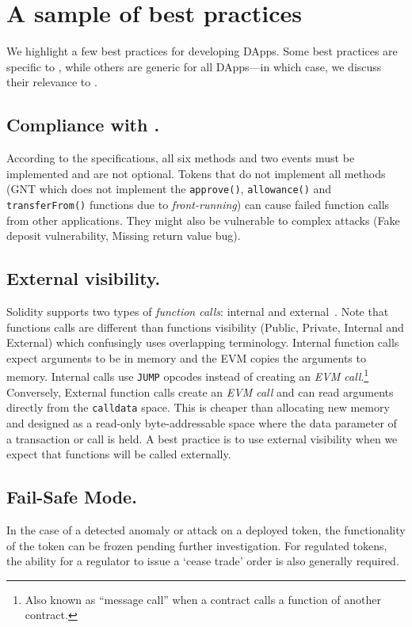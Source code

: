 
\section{A sample of best practices}\label{sec:bp}

We highlight a few best practices for developing DApps. Some best practices are specific to \erc, while others are generic for all DApps---in which case, we discuss their relevance to \erc.

\subsection{Compliance with \erc.}\label{subsec:compl}
According to the \erc specifications, all six methods and two events must be implemented and are not optional. Tokens that do not implement all methods (\eg GNT which does not implement the \texttt{approve()}, \texttt{allowance()} and \texttt{transferFrom()} functions due to \textit{front-running}\cite{GNT}) can cause failed function calls from other applications. They might also be vulnerable to complex attacks (\eg Fake deposit vulnerability\cite{DEPOSafe}, Missing return value bug\cite{ErcBug}).

\subsection{External visibility.}\label{subsec:external}
Solidity supports two types of \textit{function calls}: internal and external~\cite{SolidityDoc}. Note that functions calls are different than functions visibility (\ie Public, Private, Internal and External) which confusingly uses overlapping terminology. Internal function calls expect arguments to be in memory and the EVM copies the arguments to memory. Internal calls use \texttt{JUMP} opcodes instead of creating an \textit{EVM call}.\footnote{Also known as ``message call'' when a contract calls a function of another contract.} Conversely, External function calls create an \textit{EVM call} and can read arguments directly from the \texttt{calldata} space. This is cheaper than allocating new memory and designed as a read-only byte-addressable space where the data parameter of a transaction or call is held\cite{EthInDepth}. A best practice is to use external visibility when we expect that functions will be called externally.

\subsection{Fail-Safe Mode.}\label{subsec:failsf}
In the case of a detected anomaly or attack on a deployed \erc token, the functionality of the token can be frozen pending further investigation. For regulated tokens, the ability for a regulator to issue a `cease trade' order is also generally required. 

